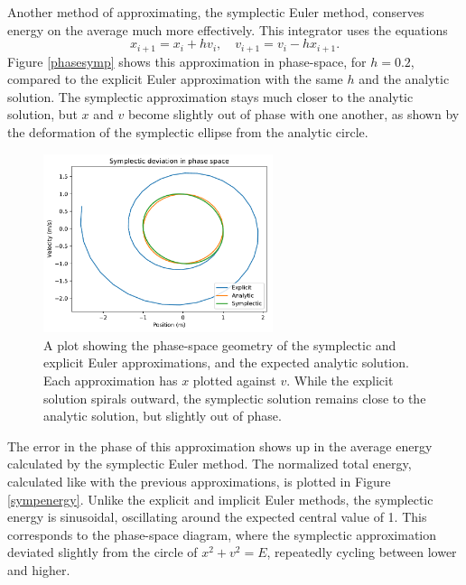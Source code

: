 \documentclass{article}
\begin{document}
Another method of approximating, the symplectic Euler method, conserves energy on the average much more effectively. This integrator uses the equations $$x_{i+1}=x_i+hv_i,\quad v_{i+1}=v_i-hx_{i+1}.$$ Figure \ref{phasesymp} shows this approximation in phase-space, for $h=0.2$, compared to the explicit Euler approximation with the same $h$ and the analytic solution. The symplectic approximation stays much closer to the analytic solution, but $x$ and $v$ become slightly out of phase with one another, as shown by the deformation of the symplectic ellipse from the analytic circle. 

\begin{figure}[H]
	\centering
	\includegraphics[width=0.6\textwidth]{eulerphasesymp.pdf}
	\caption{A plot showing the phase-space geometry of the symplectic and explicit Euler approximations, and the expected analytic solution. Each approximation has $x$ plotted against $v$. While the explicit solution spirals outward, the symplectic solution remains close to the analytic solution, but slightly out of phase.}
	\label{phasespace}
\end{figure}

The error in the phase of this approximation shows up in the average energy calculated by the symplectic Euler method. The normalized total energy, calculated like with the previous approximations, is plotted in Figure \ref{sympenergy}. Unlike the explicit and implicit Euler methods, the symplectic energy is sinusoidal, oscillating around the expected central value of 1. This corresponds to the phase-space diagram, where the symplectic approximation deviated slightly from the circle of $x^2+v^2=E$, repeatedly cycling between lower and higher. 
\end{document}
